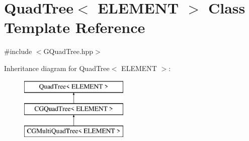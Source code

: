 \hypertarget{class_quad_tree}{}\section{Quad\+Tree$<$ E\+L\+E\+M\+E\+N\+T $>$ Class Template Reference}
\label{class_quad_tree}


{\ttfamily \#include $<$G\+Quad\+Tree.\+hpp$>$}

Inheritance diagram for Quad\+Tree$<$ E\+L\+E\+M\+E\+N\+T $>$\+:\begin{figure}[H]
\begin{center}
\leavevmode
\includegraphics[height=3.000000cm]{class_quad_tree}
\end{center}
\end{figure}
